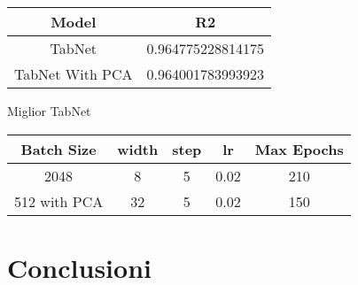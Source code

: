 \documentclass[../../Report.tex]{subfiles}
\begin{document}
\begin{table}[H]
    \centering
    \begin{tabular}{|c|c|}
        \hline
        \textbf{Model} &  \textbf{R2} \\
        \hline
        TabNet              & 0.964775228814175  \\
        TabNet With PCA     & 0.964001783993923  \\
        \hline
    \end{tabular}
    
    \label{tab:tabnet_resultsR2}
\end{table}

Miglior TabNet
\begin{table}[H]
    \centering
    \begin{tabular}{|c|c|c|c|c|}
        \hline
        \textbf{Batch Size} & \textbf{width}    & \textbf{step} & \textbf{lr}   & \textbf{Max Epochs}\\
        \hline
        2048                & 8                 & 5             & 0.02          & 210   \\
        512 with PCA                & 32                 & 5             & 0.02          & 150   \\
        \hline
    \end{tabular}
    
    \label{tab:best_tabnet}
\end{table}

\section{Conclusioni}
\end{document}

